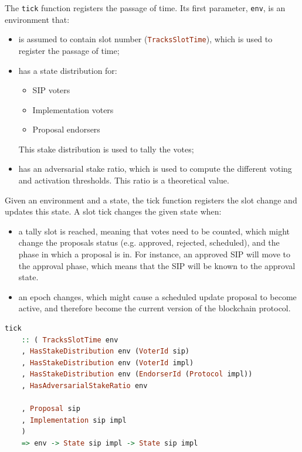 The \lstinline[language=Haskell]!tick! function registers the passage of time.
Its first
parameter, \lstinline[language=Haskell]!env!, is an environment that:

\begin{itemize}
	\item is assumed to contain slot number
	(\lstinline[language=Haskell]!TracksSlotTime!), which is
	used to register the passage of time;
	\item has a state distribution for:
	\begin{itemize}
		\item SIP voters
		\item Implementation voters
		\item Proposal endorsers
	\end{itemize}
	This stake distribution is used to tally the votes;
	\item has an adversarial stake ratio, which is used to compute the different
	voting and activation thresholds. This ratio is a theoretical value.
\end{itemize}

Given an environment and a state, the tick function registers the slot change
and updates this state. A slot tick changes the given state when:
\begin{itemize}
	\item a tally slot is reached, meaning that votes need to be counted, which
	might change the proposals status (e.g. approved, rejected, scheduled), and
	the phase in which a proposal is in. For instance, an approved SIP will move
	to the approval phase, which means that the SIP will be known to the
	approval
	state.
	\item an epoch changes, which might cause a scheduled update proposal to
	become
	active, and therefore become the current version of the blockchain protocol.
\end{itemize}

\begin{lstlisting}[language=Haskell]
	tick
	:: ( TracksSlotTime env
	, HasStakeDistribution env (VoterId sip)
	, HasStakeDistribution env (VoterId impl)
	, HasStakeDistribution env (EndorserId (Protocol impl))
	, HasAdversarialStakeRatio env

	, Proposal sip
	, Implementation sip impl
	)
	=> env -> State sip impl -> State sip impl
\end{lstlisting}

